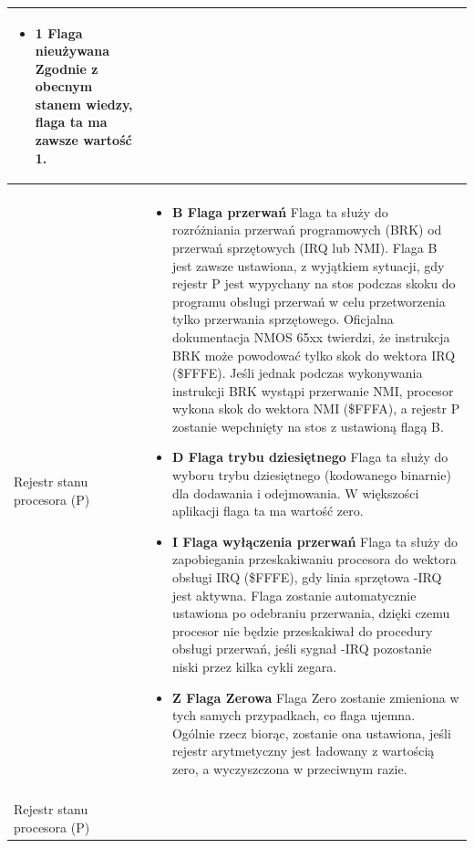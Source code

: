 \begin{longtable}{|p{5cm}|p{11cm}|}
\begin{itemize}
\item \textbf{1 Flaga nieużywana} 
Zgodnie z obecnym stanem wiedzy, flaga ta ma zawsze wartość 1.

\end{itemize} \\ \hline \\
Rejestr stanu procesora (P) &
\begin{itemize}
\item \textbf{B Flaga przerwań} 
Flaga ta służy do rozróżniania przerwań programowych (BRK) od przerwań sprzętowych (IRQ lub NMI). Flaga B jest zawsze ustawiona, z wyjątkiem sytuacji, gdy rejestr P jest wypychany na stos podczas skoku do programu obsługi przerwań w celu przetworzenia tylko przerwania sprzętowego. Oficjalna dokumentacja NMOS 65xx twierdzi, że instrukcja BRK może powodować tylko skok do wektora IRQ (\$FFFE). Jeśli jednak podczas wykonywania instrukcji BRK wystąpi przerwanie NMI, procesor wykona skok do wektora NMI (\$FFFA), a rejestr P zostanie wepchnięty na stos z ustawioną flagą B.

\item \textbf{D Flaga trybu dziesiętnego} 
Flaga ta służy do wyboru trybu dziesiętnego (kodowanego binarnie) dla dodawania i odejmowania. W większości aplikacji flaga ta ma wartość zero.

\item \textbf{I Flaga wyłączenia przerwań} 
Flaga ta służy do zapobiegania przeskakiwaniu procesora do wektora obsługi IRQ (\$FFFE), gdy linia sprzętowa -IRQ jest aktywna. Flaga zostanie automatycznie ustawiona po odebraniu przerwania, dzięki czemu procesor nie będzie przeskakiwał do procedury obsługi przerwań, jeśli sygnał -IRQ pozostanie niski przez kilka cykli zegara.

\item \textbf{Z Flaga Zerowa}
Flaga Zero zostanie zmieniona w tych samych przypadkach, co flaga ujemna. Ogólnie rzecz biorąc, zostanie ona ustawiona, jeśli rejestr arytmetyczny jest ładowany z wartością zero, a wyczyszczona w przeciwnym razie. 

\end{itemize} \\ \hline \\
Rejestr stanu procesora (P) &
\begin{itemize}


\end{itemize}
\end{longtable}
